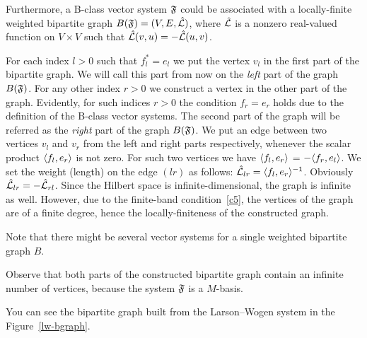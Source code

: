 \documentclass[12pt]{amsart}
\begin{document}
    Furthermore, a B-class vector system $\mathfrak{F}$ could be associated with a
      locally-finite weighted bipartite graph $B(\mathfrak{F}) = (V, E, \hat{\mathcal{L}})$, where $\hat{\mathcal{L}}$ is a
      nonzero real-valued function on $V\times V$ such that $\hat{\mathcal{L}}(v, u) = -\hat{\mathcal{L}}(u, v)$.

    For each index $l > 0$ such that $f^*_l = e_l$ we put the vertex $v_l$ in the first part of the bipartite graph.
    We will call this part from now on the \emph{left} part of the graph $B(\mathfrak{F})$.
    For any other index $r > 0$ we construct a vertex in the other part of the graph.
    Evidently, for such indices $r > 0$ the condition $f_r = e_r$ holds due to the definition of the B-class vector systems.
    The second part of the graph will be referred as the \emph{right} part of the graph $B(\mathfrak{F})$.
    We put an edge between two vertices $v_l$ and $v_r$ from the left and right parts respectively,
      whenever the scalar product $\langle f_l, e_r \rangle$ is not zero.
    For such two vertices we have $\langle f_l, e_r \rangle$ = $-\langle f_r, e_l \rangle$.
    We set the weight (length) on the edge $(lr)$ as follows: $\hat{\mathcal{L}}_{lr} = \langle f_l, e_r \rangle^{-1}$.
    Obviously $\hat{\mathcal{L}}_{lr} = -\hat{\mathcal{L}}_{rl}$.
    Since the Hilbert space is infinite-dimensional, the graph is infinite as well.
    However, due to the finite-band condition~\ref{c5}, the vertices of the graph are of a finite degree, hence the locally-finiteness of
      the constructed graph.
    \begin{remark}
      Note that there might be several vector systems for a single weighted bipartite graph $B$.
    \end{remark}
    \begin{remark}
      Observe that both parts of the constructed bipartite graph contain an infinite number of vertices, because
        the system $\mathfrak{F}$ is a $M$-basis.
    \end{remark}
    You can see the bipartite graph built from the Larson--Wogen system in the Figure~\ref{lw-bgraph}.
\end{document}
